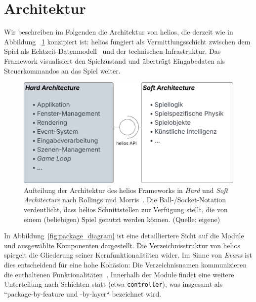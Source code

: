 \section{Architektur}
Wir beschreiben im Folgenden die Architektur von helios, die derzeit wie in Abbildung ~\ref{fig:hardarchitecture} konzipiert ist: helios fungiert als Vermittlungsschicht zwischen dem Spiel als Echtzeit-Datenmodell~\cite[525]{Gre19} und der technischen Infrastruktur.
Das Framework visualisiert den Spielzustand und überträgt Eingabedaten als Steuerkommandos an das Spiel weiter.

\begin{figure}[!h]
    \centering
    \includegraphics[width=1\columnwidth]{img/hardarchitecture.svg}
    \caption{Aufteilung der Architektur des helios Frameworks in \textit{Hard} und \textit{Soft Architecture} nach Rollings und Morris~\cite[612 ff.]{RM04}. Die Ball-/Socket-Notation verdeutlicht, dass helios Schnittstellen zur Verfügung stellt, die von einem (beliebigen) Spiel genutzt werden können. (Quelle: eigene)}
    \label{fig:hardarchitecture}
\end{figure}

In Abbildung~\ref{fig:package_diagram} ist eine detailliertere Sicht auf die Module und ausgewählte Komponenten dargestellt.
Die Verzeichnisstruktur von helios spiegelt die Gliederung seiner Kernfunktionalitäten wider.
Im Sinne von \textit{Evans} ist dies entscheidend für eine hohe Kohäsion: Die Verzeichnisnamen kommunizieren die enthaltenen Funktionalitäten~\cite[180 f.]{Eva03}.
Innerhalb der Module findet eine weitere Unterteilung nach Schichten statt (etwa \texttt{controller}), was insgesamt als ``package-by-feature und -by-layer`` bezeichnet wird.


